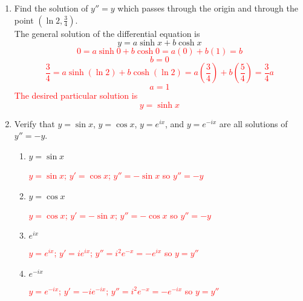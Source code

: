 \documentclass{article}
\begin{document}
\begin{enumerate}
\begin{enumerate}
    \end{enumerate}
    \item Find the solution of $y''=y$ which passes through the origin and through the point $(\ln2,\frac{3}{4})$.
    \vspace{5mm}\\
    The general solution of the differential equation is
    \[
    y = a \sinh x + b \cosh x
    \]
    \textcolor{red}{
    \[
        0 = a \sinh 0 + b \cosh 0 = a (0) + b(1) = b
    \]
    \[
        b = 0
    \]
    \[
        \frac{3}{4} = a \sinh (\ln2) + b \cosh (\ln2) = a (\frac{3}{4}) + b(\frac{5}{4}) = \frac{3}{4} a
    \]
    \[
        a = 1
    \]
    The desired particular solution is
    \[
        y = \sinh x
    \]
    }
\pagebreak
    \item Verify that $y = \sin x$, $y = \cos x$, $y= e^{ix}$, and $y= e^{-ix}$ are all solutions of $y''=-y$.
    \begin{enumerate}
        \item $y = \sin x$
        \textcolor{red}{
        \begin{center}
            $y=\sin x$; $y'=\cos x$; $y''= - \sin x$ so $y''=-y$
        \end{center}
        }

        \item $y = \cos x$
        \textcolor{red}{
        \begin{center}
            $y=\cos x$; $y'= - \sin x$; $y''= - \cos x$ so $y''=-y$
        \end{center}
        }

        \item $e^{ix}$
        \textcolor{red}{
        \begin{center}
            $y=e^{ix}$; $y'=ie^{ix}$; $y''=i^2e^{-x}=-e^{ix}$ so $y=y''$
        \end{center}
        }

        \item $e^{-ix}$
        \textcolor{red}{
        \begin{center}
            $y=e^{-ix}$; $y'=-ie^{-ix}$; $y''=i^2e^{-x}=-e^{-ix}$ so $y=y''$
        \end{center}
        }
        

\end{enumerate}
\end{enumerate}
\end{document}
